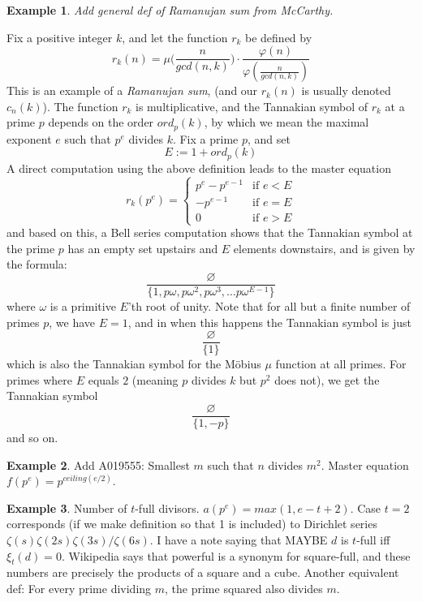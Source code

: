 \documentclass[a4paper]{article}
\theoremstyle{definition}
\newtheorem{example}{Example}[section]
\theoremstyle{remark}
\newcommand{\threepartdef}[6]
{
	\left\{
		\begin{array}{lll}
			#1 & \mbox{if } #2 \\
			#3 & \mbox{if } #4 \\
			#5 & \mbox{} #6
		\end{array}
	\right.
}
\begin{document}
\begin{example}

\emph{Add general def of Ramanujan sum from McCarthy.}


Fix a positive integer $k$, and let the function $r_k$ be defined by
$$r_k(n) = \mu \big(   \frac{n}{gcd(n, k)}    \big) \cdot \frac{ \varphi(n)   }{  \varphi(\frac{n}{gcd(n, k)})  }  $$  
This is an example of a \emph{Ramanujan sum}, (and our $r_k(n)$ is usually denoted $c_n(k)$). The function $r_k$ is multiplicative, and the Tannakian symbol of $r_k$ at a prime $p$ depends on the order $ord_p(k)$, by which we mean the maximal exponent $e$ such that $p^e$ divides $k$. Fix a prime $p$, and set
$$  E:= 1+ ord_p(k) $$
A direct computation using the above definition leads to the master equation
$$  r_k(p^e) =  \threepartdef { p^e-p^{e-1} } { e < E } {-p^{e-1}} { e = E  } {0}  { \textrm{if } e > E} $$
and based on this, a Bell series computation shows that the Tannakian symbol at the prime $p$ has an empty set upstairs and $E$ elements downstairs, and is given by the formula:
$$  \frac{  \varnothing }{  \{ 1, p \omega, p \omega^2, p \omega^3, \ldots p \omega^{E-1}  \} }   $$
where $\omega$ is a primitive $E$'th root of unity. Note that for all but a finite number of primes $p$, we have $E=1$, and in when this happens the Tannakian symbol is just
$$   \frac{  \varnothing }{ \{ 1\} }    $$
which is also the Tannakian symbol for the M{\"o}bius $\mu$ function at all primes. For primes where $E$ equals $2$ (meaning $p$ divides $k$ but $p^2$ does not), we get the Tannakian symbol
$$   \frac{  \varnothing }{  \{ 1, -p \} }    $$
and so on.
\end{example}


\begin{example}
Add A019555: Smallest $m$ such that $n$ divides $m^2$. Master equation $f(p^e) = p^{ceiling(e/2)}$.

\end{example}

\begin{example}
Number of $t$-full divisors. $a(p^e) = max(1, e-t+2)$. Case $t=2$ corresponds (if we make definition so that 1 is included) to Dirichlet series $\zeta(s) \zeta(2s) \zeta(3s) / \zeta(6s)$. I have a note saying that MAYBE $d$ is $t$-full iff $\xi_t(d) = 0$. Wikipedia says that powerful is a synonym for square-full, and these numbers are precisely the products of a square and a cube. Another equivalent def: For every prime dividing $m$, the prime squared also divides $m$. 
\end{example}
\end{document}
